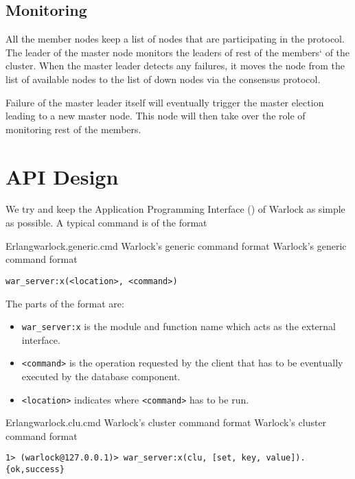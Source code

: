 \subsection{Monitoring}

All the member nodes%
keep a list of nodes that are participating in the protocol.
The leader of the master node monitors the leaders of rest of the members`
of the cluster. When the master leader detects any failures, it moves the
node from the list of available nodes to the list of down nodes via the
consensus protocol.

Failure of the master leader itself will eventually trigger the master election
leading to a new master node. This node will then take over the role of
monitoring rest of the members.

\section{API Design}

We try and keep the Application Programming Interface () of Warlock as
simple as possible. A typical command is of the format

\begin{scode}{Erlang}{warlock.generic.cmd}{%
  Warlock's generic command format}{%
  Warlock's generic command format}
  \begin{lstlisting}
war_server:x(<location>, <command>)
  \end{lstlisting}
\end{scode}

The parts of the format are:

\begin{itemize}
  \item \texttt{war\_server:x} is the module and function name which acts
    as the external interface.
  \item \texttt{<command>} is the operation requested by the client that has to
    be eventually executed by the database component.
  \item \texttt{<location>} indicates where \texttt{<command>} has to be
    run.
\end{itemize}

\begin{scode}{Erlang}{warlock.clu.cmd}{%
  Warlock's cluster command format}{%
  Warlock's cluster command format}
  \begin{lstlisting}
1> (warlock@127.0.0.1)> war_server:x(clu, [set, key, value]).
{ok,success}
  \end{lstlisting}
\end{scode}


